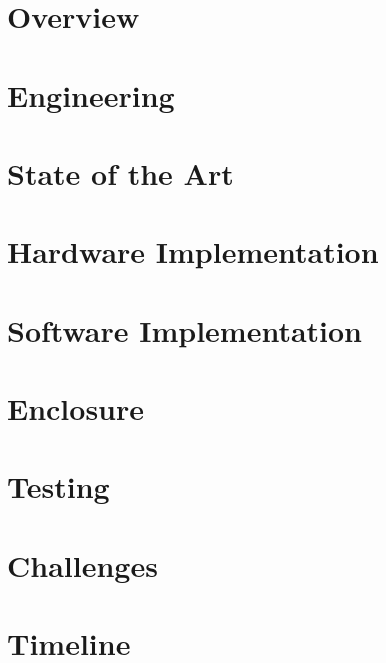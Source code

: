 \documentclass[11pt,letterpaper]{article}
\begin{document}
\section{Overview}
\label{sec:overview}

\clearpage

\section{Engineering}
\label{sec:engineering}

\clearpage

\section{State of the Art}
\label{sec:state-of-the-art}

\clearpage

\section{Hardware Implementation}
\label{sec:hardware}

\clearpage

\section{Software Implementation}
\label{sec:software}

\clearpage

\section{Enclosure}
\label{sec:enclosure}

\clearpage

\section{Testing}
\label{sec:testing}

\clearpage

\section{Challenges}
\label{sec:challenges}

\clearpage

\section{Timeline}
\label{sec:timeline}

\clearpage
\end{document}
